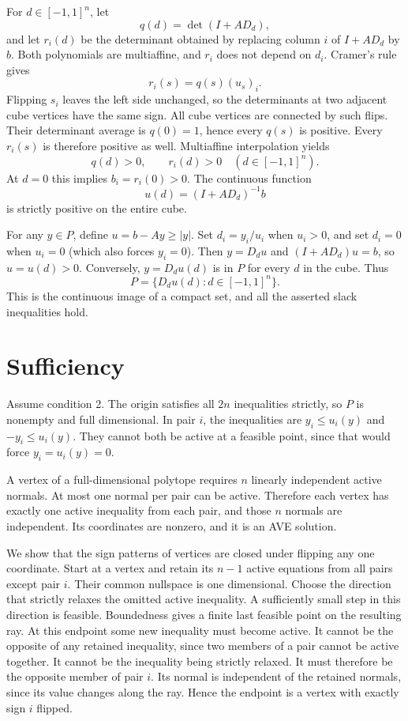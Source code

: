 For $d\in[-1,1]^n$, let
\[
 q(d)=\det(I+AD_d),
\]
and let $r_i(d)$ be the determinant obtained by replacing column $i$ of $I+AD_d$ by $b$. Both polynomials are multiaffine, and $r_i$ does not depend on $d_i$. Cramer's rule gives
\[
 r_i(s)=q(s)(u_s)_i.
\]
Flipping $s_i$ leaves the left side unchanged, so the determinants at two adjacent cube vertices have the same sign. All cube vertices are connected by such flips. Their determinant average is $q(0)=1$, hence every $q(s)$ is positive. Every $r_i(s)$ is therefore positive as well. Multiaffine interpolation yields
\[
 q(d)>0,\qquad r_i(d)>0\quad(d\in[-1,1]^n).
\]
At $d=0$ this implies $b_i=r_i(0)>0$. The continuous function
\[
 u(d)=(I+AD_d)^{-1}b
\]
is strictly positive on the entire cube.

For any $y\in P$, define $u=b-Ay\ge|y|$. Set $d_i=y_i/u_i$ when $u_i>0$, and set $d_i=0$ when $u_i=0$ (which also forces $y_i=0$). Then $y=D_du$ and $(I+AD_d)u=b$, so $u=u(d)>0$. Conversely, $y=D_du(d)$ is in $P$ for every $d$ in the cube. Thus
\[
 P=\{D_du(d):d\in[-1,1]^n\}.
\]
This is the continuous image of a compact set, and all the asserted slack inequalities hold.
\section{Sufficiency}
Assume condition 2. The origin satisfies all $2n$ inequalities strictly, so $P$ is nonempty and full dimensional. In pair $i$, the inequalities are $y_i\le u_i(y)$ and $-y_i\le u_i(y)$. They cannot both be active at a feasible point, since that would force $y_i=u_i(y)=0$.

A vertex of a full-dimensional polytope requires $n$ linearly independent active normals. At most one normal per pair can be active. Therefore each vertex has exactly one active inequality from each pair, and those $n$ normals are independent. Its coordinates are nonzero, and it is an AVE solution.

We show that the sign patterns of vertices are closed under flipping any one coordinate. Start at a vertex and retain its $n-1$ active equations from all pairs except pair $i$. Their common nullspace is one dimensional. Choose the direction that strictly relaxes the omitted active inequality. A sufficiently small step in this direction is feasible. Boundedness gives a finite last feasible point on the resulting ray. At this endpoint some new inequality must become active. It cannot be the opposite of any retained inequality, since two members of a pair cannot be active together. It cannot be the inequality being strictly relaxed. It must therefore be the opposite member of pair $i$. Its normal is independent of the retained normals, since its value changes along the ray. Hence the endpoint is a vertex with exactly sign $i$ flipped.

